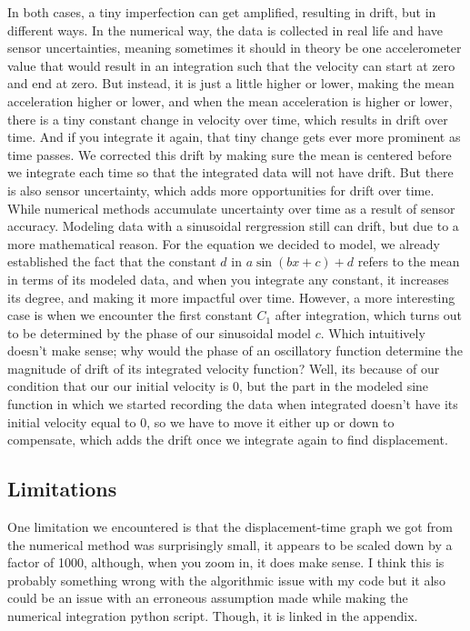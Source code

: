 \documentclass[12pt]{article}
\begin{document}
In both cases, a tiny imperfection can get amplified, resulting in drift, but in different ways. In the numerical way, the data is collected in real life and have sensor uncertainties, meaning sometimes it should in theory be one accelerometer value that would result in an integration such that the velocity can start at zero and end at zero. But instead, it is just a little higher or lower, making the mean acceleration higher or lower, and when the mean acceleration is higher or lower, there is a tiny constant change in velocity over time, which results in drift over time.  And if you integrate it again, that tiny change gets ever more prominent as time passes. We corrected this drift by making sure the mean is centered before we integrate each time so that the integrated data will not have drift. But there is also sensor uncertainty, which adds more opportunities for drift over time. 
While numerical methods accumulate uncertainty over time as a result of sensor accuracy. Modeling data with a sinusoidal rergression still can drift, but due to a more mathematical reason. For the equation we decided to model, we already established the fact that the constant $d$ in $a\sin(bx+c)+d$ refers to the mean in terms of its modeled data, and when you integrate any constant, it increases its degree, and making it more impactful over time. However, a more interesting case is when we encounter the first constant $C_{1}$ after integration, which turns out to be determined by the phase of our sinusoidal model $c$. Which intuitively doesn't make sense; why would the phase of an oscillatory function determine the magnitude of drift of its integrated velocity function? Well, its because of our condition that our our initial velocity is 0, but the part in the modeled sine function in which we started recording the data when integrated doesn't have its initial velocity equal to 0, so we have to move it either up or down to compensate, which adds the drift once we integrate again to find displacement.

\subsection{Limitations}
One limitation we encountered is that the displacement-time graph we got from the numerical method was surprisingly small, it appears to be scaled down by a factor of 1000, although, when you zoom in, it does make sense. I think this is probably something wrong with the algorithmic issue with my code but it also could be an issue with an erroneous assumption made while making the numerical integration python script. Though, it is linked in the appendix.
\end{document}
